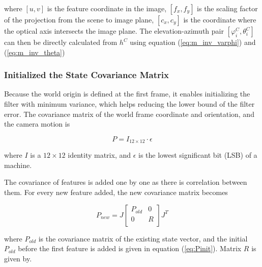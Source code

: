 \noindent where $[u, v]$ is the feature coordinate in the image, $
[f_{x}, f_{y}]$ is the scaling factor of the projection from the scene
to image plane, $[c_x, c_y]$ is the coordinate where the optical axis
intersects the image plane. The elevation-azimuth pair $[\varphi
_{i}^{C}, \theta _{i}^{C}]$ can then be directly calculated from
$h^{C}$ using equation (\ref{eq:m_inv_varphi}) and (\ref{eq:m_inv_theta})

\subsubsection{Initialized the State Covariance Matrix}

Because the world origin is defined at the first frame, it enables 
initializing the filter with minimum variance, which helps reducing the 
lower bound of the filter error. The covariance matrix of the world frame
coordinate and orientation, and the camera motion is 

\begin{equation}
\label{eq:Pinit}
P=I_{12\times 12}\cdot \epsilon 
\end{equation}

\noindent where $I$ is a $12\times12$ identity matrix, and $\epsilon $ is the 
lowest significant bit (LSB) of a machine.

The covariance of features is added one by one as there is 
correlation between them. For every new feature added, the new 
covariance matrix becomes

\begin{equation}
\label{eq:Pnew}
P_{new}=J\begin{bmatrix}
P_{old} & 0 \\
0 & R \\
\end{bmatrix}
J^{T}
\end{equation}

\noindent where $P_{old}$ is the covariance matrix of the existing state vector, 
and the initial $P_{old}$ before the first feature is added is given
in equation (\ref{eq:Pinit}). Matrix $R$ is given by.

